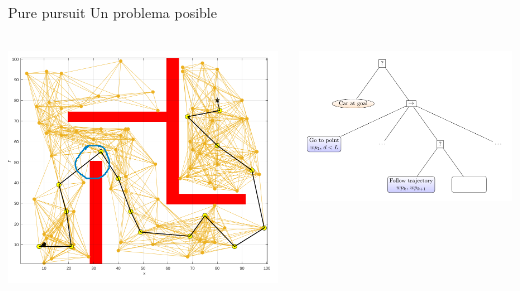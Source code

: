 \documentclass[presentation,aspectratio=169]{beamer}
\begin{document}
\begin{frame}[label={sec:orgf252dcd}]{Pure pursuit}
Un problema posible

\begin{columns}
\begin{column}{0.4\columnwidth}
\begin{center}
  \includegraphics[width=\linewidth]{../figures/prm-example}
\end{center}
\end{column}

\begin{column}{0.6\columnwidth}
\pause
\begin{center}
  \includegraphics[width=\linewidth]{../figures/bt-pure-pursuit-collision-excercise}
\end{center}
\end{column}
\end{columns}
\end{frame}
\end{document}
